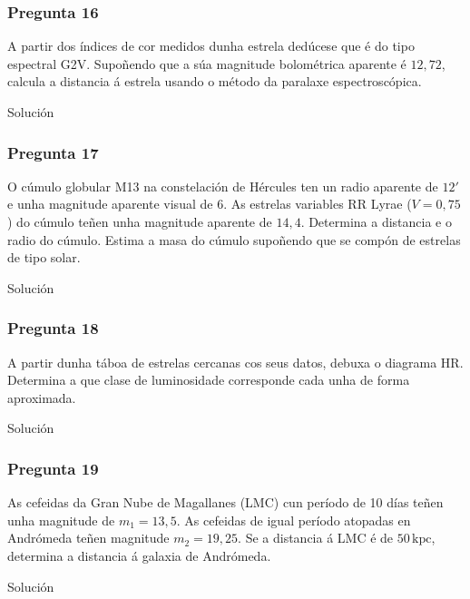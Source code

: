 \vspace*{2em}

\begin{Enunciado}
	\subsubsection{Pregunta 16}

	A partir dos índices de cor medidos dunha estrela dedúcese que é do tipo espectral G2V. Supoñendo que a súa magnitude bolométrica aparente é $12{,}72$, calcula a distancia á estrela usando o método da paralaxe espectroscópica.

\end{Enunciado}
Solución

\vspace*{2em}

\begin{Enunciado}
	\subsubsection{Pregunta 17}

	O cúmulo globular M13 na constelación de Hércules ten un radio aparente de $12'$ e unha magnitude aparente visual de 6. As estrelas variables RR Lyrae ($V = 0{,}75$) do cúmulo teñen unha magnitude aparente de $14{,}4$. Determina a distancia e o radio do cúmulo. Estima a masa do cúmulo supoñendo que se compón de estrelas de tipo solar.

\end{Enunciado}
Solución

\vspace*{2em}

\begin{Enunciado}
	\subsubsection{Pregunta 18}

	A partir dunha táboa de estrelas cercanas cos seus datos, debuxa o diagrama HR. Determina a que clase de luminosidade corresponde cada unha de forma aproximada.

\end{Enunciado}
Solución

\vspace*{2em}

\begin{Enunciado}
	\subsubsection{Pregunta 19}

	As cefeidas da Gran Nube de Magallanes (LMC) cun período de 10 días teñen unha magnitude de $m_1 = 13{,}5$. As cefeidas de igual período atopadas en Andrómeda teñen magnitude $m_2 = 19{,}25$. Se a distancia á LMC é de $50\,\text{kpc}$, determina a distancia á galaxia de Andrómeda.

\end{Enunciado}
Solución

